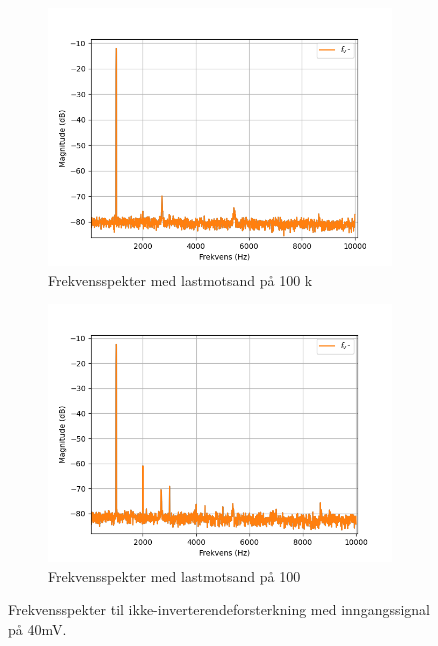 \begin{figure}[!hbt]
    \centering
    \begin{subfigure}{.5\textwidth}
        \centering
        \includegraphics[width=1\linewidth]{./Images/03Research/noninvertingspektrum100k.png}
        \caption{Frekvensspekter med lastmotsand på 100 k\text{$\Omega$}}
        \label{fig:ikkeinvspek100k}
    \end{subfigure}%
    \begin{subfigure}{.5\textwidth}
        \centering
        \includegraphics[width=1\linewidth]{./Images/03Research/noninvertingspektrum100.png}
        \caption{Frekvensspekter med lastmotsand på 100 \text{$\Omega$}}
        \label{fig:ikkeinvspek100}
    \end{subfigure}
    \caption{Frekvensspekter til ikke-inverterendeforsterkning med inngangssignal på 40mV.}
    \label{fig:ikkeinvspek}
\end{figure}

